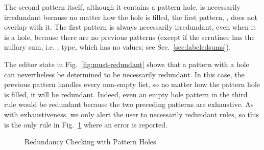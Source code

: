The second pattern itself, although it contains a pattern hole, is necessarily irredundant because no matter how the hole is filled, the first pattern, \li{[]}, does not overlap with it. The first pattern is always necessarily irredundant, even when it is a hole, because
there are no previous patterns (except if the scrutinee has the nullary sum, i.e. , type, which has no values; see Sec.~\ref{sec:labeledsums}).

The editor state in Fig.~\ref{fig:must-redundant} shows that a pattern with a hole can nevertheless be determined to be necessarily redundant.
In this case, the previous pattern handles every non-empty list, so no matter how the pattern hole is filled, it will be redundant.
Indeed, even an empty hole pattern in the third rule would be redundant because the two preceding patterns are exhaustive.
 As with exhaustiveness, we only alert
the user to necessarily redundant rules, so this is the only rule in Fig.~\ref{fig:redundancy} where an error is reported.

\begin{figure}
  \centering
    \hfill
  \caption{Redundancy Checking with Pattern Holes}
  \label{fig:redundancy}
\end{figure}


